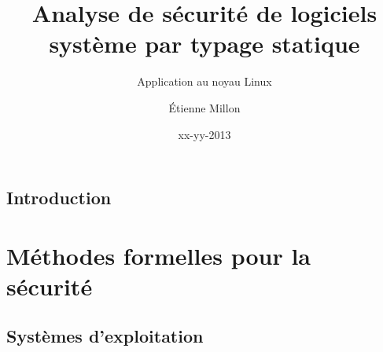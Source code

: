 \documentclass[a4paper,11pt]{memoir}
\title{Analyse de sécurité de logiciels système par typage statique}
\subtitle{Application au noyau Linux}
\author{Étienne Millon}
\date{xx-yy-2013}
\begin{document}
\frontmatter

\begin{titlingpage}
\titleUL{}
\end{titlingpage}





\asuacknowledgements

%

\clearpage


\tableofcontents

\mainmatter

\chapter{Introduction}

\label{cha:intro}




\part{Méthodes formelles pour la sécurité}
\label{part:ctx}


\chapter{Systèmes d'exploitation}

\label{cha:os}


\end{document}

